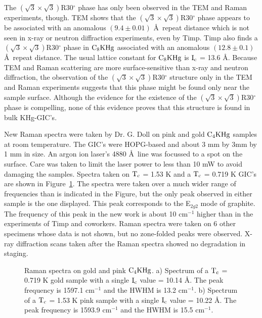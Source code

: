         The $(\sqrt{3}  \times \sqrt{3})$R30$^{\circ}$ phase has  only been
ob\-served  in  the TEM and  Raman\cite{K167} experiments, though.  TEM shows
that  the   $(\sqrt{3}  \times   \sqrt{3})$R30$^{\circ}$  phase  appears to be
associated with an anomalous $(9.4 \pm 0.01)$ \AA\ repeat distance which is
not seen   in  x-ray or  neutron  diffraction   experiments,  even by Timp.
Timp\cite{K167}  also finds  a   $(\sqrt{3}  \times \sqrt{3})$R30$^{\circ}$
phase in $\rm C_8KHg$  associated with  an anomalous $(12.8  \pm 0.1)$ \AA\
repeat distance.  The usual lattice constant for $\rm  C_8KHg$ is $\rm I_c$
= 13.6 \AA.\cite{kamitakahara84b,K167} Because TEM and Raman scattering are
more surface-sensitive than  x-ray and neutron diffraction, the observation
of the $(\sqrt{3} \times \sqrt{3})$R30$^{\circ}$ structure only in  the TEM
and Raman experiments suggests that this phase might be found only near the
sample surface.  Although the evidence for the  existence of the $(\sqrt{3}
\times \sqrt{3})$R30$^{\circ}$ phase is  compelling,  none of this evidence
proves that this structure is found in bulk KHg-GIC's.

        New Raman spectra were taken by Dr.  G. Doll on pink and  gold $\rm
C_4KHg$ samples at room temperature.  The GIC's were HOPG-based and about 3
mm  by 3mm by  1  mm in  size.   An argon   ion  laser's 4880 \AA\ line was
focussed to a spot on the surface.  Care was taken to limit the laser power
to less than 10 mW  to avoid damaging  the samples.  Spectra taken  on $\rm
T_c$   =  1.53  K   and  a   $\rm T_c$ =  0.719  K   GIC's   are  shown  in
Figure~\ref{ramfig}.  The  spectra were taken over a  much wider   range of
frequencies than is indicated in the Figure, but the  only peak observed in
either sample is the one displayed.  This peak corresponds to the E$_{2g2}$
mode of graphite.\cite{N128} The frequency of this  peak in the new work is
about   10    cm$^{-1}$ higher than    in  the   experiments   of Timp  and
coworkers.\cite{N128}  Raman spectra were taken  on 6 other specimens whose
data is  not   shown, but no    zone-folded peaks were   observed.    X-ray
diffraction scans taken  after the Raman spectra showed  no degradation  in
staging.

\begin{figure}
\vspace{7.5in}
\caption[Raman spectra on $\rm T_c$ = 0.719 K and  $\rm T_c$ = 1.5 K $\rm
C_4KHg$.]{Raman  spectra on gold  and pink $\rm C_4KHg$.  a)  Spectrum of a
$\rm T_c$ = 0.719 K gold sample with a single $\rm I_c$ value  = 10.14 \AA.
The peak frequency is 1597.1 cm$^{-1}$ and the HWHM is  13.2 cm$^{-1}$.  b)
Spectrum of a $\rm T_c$ = 1.53 K pink sample with  a single $\rm I_c$ value
= 10.22 \AA.  The peak  frequency is 1593.9  cm$^{-1}$ and the HWHM is 15.5
cm$^{-1}$.}
\label{ramfig}
\end{figure}

